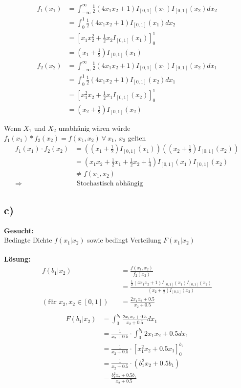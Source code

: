 \documentclass{article}
\begin{document}
\begin{align*}
    f_{1}(x_{1}) &= \int_{-\infty}^{\infty}\frac{1}{2}(4x_{1}x_{2}+ 1)I_{[0,1]}(x_{1})I_{[0,1]}(x_{2}) dx_{2} \\
    &=\int_{0}^{1}\frac{1}{2}(4x_{1}x_{2}+ 1)I_{[0,1]}(x_{1}) dx_{2} \\
    &= [x_{1}x_{2}^{2} + \frac{1}{2}x_{2}I_{[0,1]}(x_{1})]_{0}^{1} \\
    &= (x_{1} + \frac{1}{2}) I_{[0,1]}(x_{1}) \\
    f_{2}(x_{2}) &= \int_{-\infty}^{\infty}\frac{1}{2}(4x_{1}x_{2}+ 1)I_{[0,1]}(x_{1})I_{[0,1]}(x_{2}) dx_{1} \\
    &=\int_{0}^{1}\frac{1}{2}(4x_{1}x_{2}+ 1)I_{[0,1]}(x_{2}) dx_{1} \\
    &= [x_{1}^{2}x_{2} + \frac{1}{2}x_{1}I_{[0,1]}(x_{2})]_{0}^{1} \\
    &= (x_{2} + \frac{1}{2} )I_{[0,1]}(x_{2}) 
\end{align*}

Wenn $X_1$ und $X_2$ unabhänig wären würde $f_{1}(x_{1})* f_2(x_{2}) = f(x_1, x_2)~ \forall ~ x_1, ~ x_{2}$ gelten
\begin{align*}
    f_1(x_1) \cdot f_2(x_2) &=((x_{1} + \frac{1}{2})I_{[0,1]}(x_{1}))  ((x_{2} + \frac{1}{2} )I_{[0,1]}(x_{2})) \\
    &= (x_{1}x_{2} + \frac{1}{2}x_{1} + \frac{1}{2}x_{2} + \frac{1}{4}) I_{[0,1]}(x_{1}) I_{[0,1]}(x_{2}) \\
    &\neq f(x_{1}, x_{2}) \\ 
    \Longrightarrow &\text{ Stochastisch abhängig}
\end{align*}

\subsection*{c)}
\textbf{Gesucht:}\\

Bedingte Dichte $f(x_1|x_2)$ sowie bedingt Verteilung $F(x_1|x_2)$ \\ \\
\textbf{Lösung: }\\

\begin{align*}
    f(b_1|x_2) &= \frac{f(x_{1}, x_{2})}{f_2(x_2)} \\
    &= \frac{\frac{1}{2}(4x_{1}x_{2}+ 1)I_{[0,1]}(x_{1})I_{[0,1]}(x_{2})}{(x_{2} + \frac{1}{2} )I_{[0,1]}(x_{2})} \\
    (\text{für } x_2, x_2 \in [0,1])\quad &= \frac{2x_1x_2 + 0.5}{x_2 + 0.5} \\ 
\end{align*}
\begin{align*}
    F(b_1|x_2) &= \int_{0}^{b_1} \frac{2x_1x_2 + 0.5}{x_2 + 0.5} dx_1 \\
    &= \frac{1}{x_2 + 0.5} \cdot \int_{0}^{b_1}2x_1x_2 + 0.5 dx_1\\ 
    &= \frac{1}{x_2 + 0.5} \cdot [x_{1}^{2} x_2 + 0.5x_1]_{0}^{b_1}\\ 
    &= \frac{1}{x_2 + 0.5} \cdot (b_{1}^2 x_{2} + 0.5 b_1 ) \\
    &= \frac{b_{1}^2 x_{2} + 0.5 b_1 }{x_2 + 0.5}
\end{align*}
\end{document}
